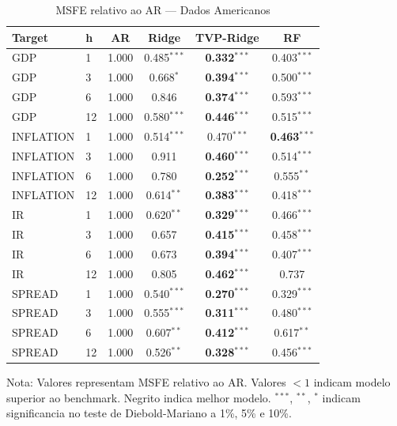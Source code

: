 \begin{table}[ht]
\centering
\caption{MSFE relativo ao AR --- Dados Americanos}
\label{tab:msfe_relative}
\begin{tabular}{llcccc}
\hline\hline
Target & h & AR & Ridge & TVP-Ridge & RF \\
\hline
GDP & 1 & 1.000 & 0.485$^{***}$ & \textbf{0.332}$^{***}$ & 0.403$^{***}$ \\
GDP & 3 & 1.000 & 0.668$^{*}$ & \textbf{0.394}$^{***}$ & 0.500$^{***}$ \\
GDP & 6 & 1.000 & 0.846 & \textbf{0.374}$^{***}$ & 0.593$^{***}$ \\
GDP & 12 & 1.000 & 0.580$^{***}$ & \textbf{0.446}$^{***}$ & 0.515$^{***}$ \\
INFLATION & 1 & 1.000 & 0.514$^{***}$ & 0.470$^{***}$ & \textbf{0.463}$^{***}$ \\
INFLATION & 3 & 1.000 & 0.911 & \textbf{0.460}$^{***}$ & 0.514$^{***}$ \\
INFLATION & 6 & 1.000 & 0.780 & \textbf{0.252}$^{***}$ & 0.555$^{**}$ \\
INFLATION & 12 & 1.000 & 0.614$^{**}$ & \textbf{0.383}$^{***}$ & 0.418$^{***}$ \\
IR & 1 & 1.000 & 0.620$^{**}$ & \textbf{0.329}$^{***}$ & 0.466$^{***}$ \\
IR & 3 & 1.000 & 0.657 & \textbf{0.415}$^{***}$ & 0.458$^{***}$ \\
IR & 6 & 1.000 & 0.673 & \textbf{0.394}$^{***}$ & 0.407$^{***}$ \\
IR & 12 & 1.000 & 0.805 & \textbf{0.462}$^{***}$ & 0.737 \\
SPREAD & 1 & 1.000 & 0.540$^{***}$ & \textbf{0.270}$^{***}$ & 0.329$^{***}$ \\
SPREAD & 3 & 1.000 & 0.555$^{***}$ & \textbf{0.311}$^{***}$ & 0.480$^{***}$ \\
SPREAD & 6 & 1.000 & 0.607$^{**}$ & \textbf{0.412}$^{***}$ & 0.617$^{**}$ \\
SPREAD & 12 & 1.000 & 0.526$^{**}$ & \textbf{0.328}$^{***}$ & 0.456$^{***}$ \\
\hline\hline
\end{tabular}
\begin{tablenotes}
\small
\item Nota: Valores representam MSFE relativo ao AR. Valores $< 1$ indicam modelo superior ao benchmark. Negrito indica melhor modelo. $^{***}$, $^{**}$, $^{*}$ indicam significancia no teste de Diebold-Mariano a 1\%, 5\% e 10\%.
\end{tablenotes}
\end{table}

